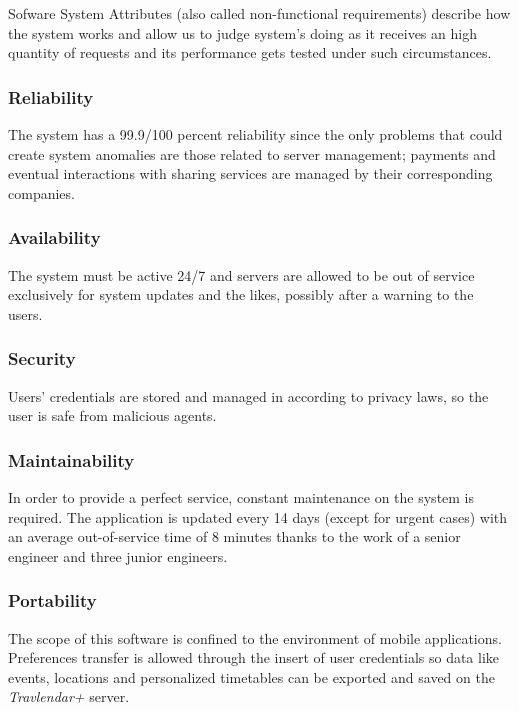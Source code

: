 Sofware System Attributes (also called non-functional requirements) describe how the system works and allow us to judge system's doing as it receives an high quantity of requests and its performance gets tested under such circumstances.

\subsubsection{Reliability}
The system has a 99.9/100 percent reliability since the only problems that could create system anomalies are those related to server management; payments and eventual interactions with sharing services are managed by their corresponding companies.

\subsubsection{Availability}
The system must be active 24/7 and servers are allowed to be out of service exclusively for system updates and the likes, possibly after a  warning to the users.

\subsubsection{Security}
Users' credentials are stored and managed in according to privacy laws, so the user is safe from malicious agents.

\subsubsection{Maintainability}
In order to provide a perfect service, constant maintenance on the system is required. The application is updated every 14 days (except for urgent cases) with an average out-of-service time of 8 minutes thanks to the work of a senior engineer and three junior engineers.

\subsubsection{Portability}
The scope of this software is confined to the environment of mobile applications. Preferences transfer is allowed through the insert of user credentials so data like events, locations and personalized timetables can be exported and saved on the \textit{Travlendar+} server.
